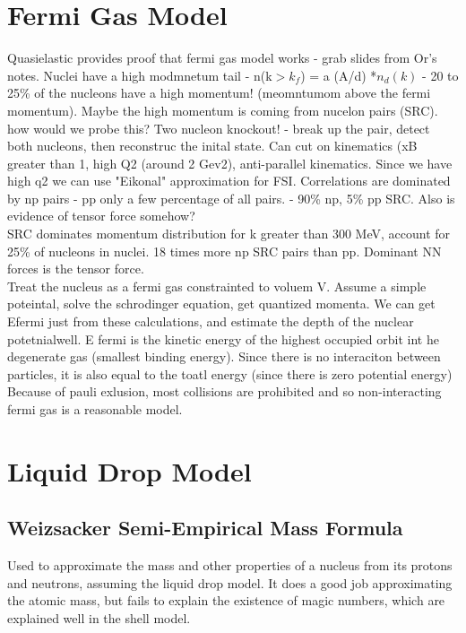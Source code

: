     \section{Fermi Gas Model}
    Quasielastic provides proof that fermi gas model works - grab slides from Or's notes. 
        \indent Nuclei have a high modmnetum tail - n(k$>k_f$) = a (A/d) *$n_d(k)$ - 20 to 25\% of the nucleons have a high momentum! (meomntumom above the fermi momentum). Maybe the high momentum is coming from nucelon pairs (SRC). how would we probe this? Two nucleon knockout! - break up the pair, detect both nucleons, then reconstruc the inital state. Can cut on kinematics (xB greater than 1, high Q2 (around 2 Gev2), anti-parallel kinematics. Since we have high q2 we can use "Eikonal" approximation for FSI. Correlations are dominated by np pairs - pp only a few percentage of all pairs. - 90\% np, 5\% pp SRC. Also is evidence of tensor force somehow?\\
        SRC dominates momentum distribution for k greater than 300 MeV, account for 25\% of nucleons in nuclei. 18 times more np SRC pairs than pp. Dominant NN forces is the tensor force. \\
        \newline
        \indent Treat the nucleus as a fermi gas constrainted to voluem V. Assume a simple poteintal, solve the schrodinger equation, get quantized momenta. We can get Efermi just from these calculations, and estimate the depth of the nuclear potetnialwell. E fermi is the kinetic energy of the highest occupied orbit int he degenerate gas (smallest binding energy). Since there is no interaciton between particles, it is also equal to the toatl energy (since there is zero potential energy) Because of pauli exlusion, most collisions are prohibited and so non-interacting fermi gas is a reasonable model. 
    \section{Liquid Drop Model}
        \subsection{Weizsacker Semi-Empirical Mass Formula}
            \indent Used to approximate the mass and other properties of a nucleus from its protons and neutrons, assuming the liquid drop model. It does a good job approximating the atomic mass, but fails to explain the existence of magic numbers, which are explained well in the shell model. \\
            

